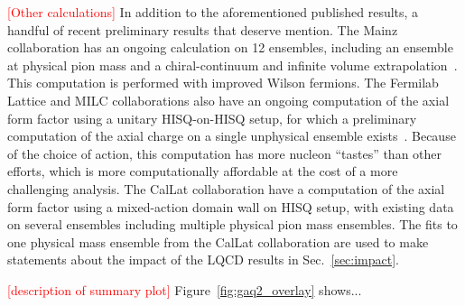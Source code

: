 \textcolor{red}{[Other calculations]}
In addition to the aforementioned published results, 
 a handful of recent preliminary results that deserve mention.
The Mainz collaboration has an ongoing calculation on 12 ensembles,
 including an ensemble at  physical pion mass
 and a chiral-continuum and infinite volume extrapolation~\cite{Djukanovic:2021yqg}.
This computation is performed with improved Wilson fermions.
The Fermilab Lattice and MILC collaborations also have an ongoing
 computation of the axial form factor using a unitary HISQ-on-HISQ setup,
 for which a preliminary computation of the axial charge on
 a single unphysical ensemble exists~\cite{Lin:2020wko}.
Because of the choice of action, this computation has more nucleon ``tastes''
 than other efforts, which is more computationally affordable
 at the cost of a more challenging analysis.
The CalLat collaboration have a computation of the axial form factor
 using a mixed-action domain wall on HISQ setup,
 with existing data on several ensembles including multiple physical pion mass ensembles.
The fits to one physical mass ensemble from the CalLat collaboration are used
 to make statements about the  impact of the LQCD results in Sec.~\ref{sec:impact}.

\textcolor{red}{[description of summary plot]}
Figure~\ref{fig:gaq2_overlay} shows...

